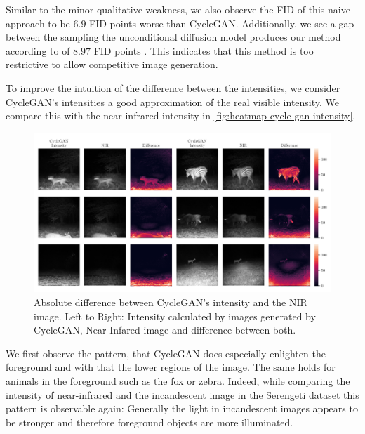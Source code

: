 Similar to the minor qualitative weakness, we also observe the FID of this naive approach to be $6.9$ FID points worse than CycleGAN.
Additionally, we see a gap between the sampling the unconditional diffusion model produces our method according to  of $8.97$ FID points \parencite{sbgm}.
This indicates that this method is too restrictive to allow competitive image generation.



To improve the intuition of the difference between the intensities, we consider CycleGAN's intensities a good approximation of the real visible intensity.
We compare this with the near-infrared intensity in \autoref{fig:heatmap-cycle-gan-intensity}.

\begin{figure}[htp!]
    \centering
    \includegraphics[width=\textwidth]{gfx/heatmap-nir-cycle-gan-intensity-diff.pdf}
    \caption{
        Absolute difference between CycleGAN's intensity and the NIR image.
        Left to Right: Intensity calculated by images generated by CycleGAN, Near-Infared image \parencite{serengeti} and difference between both.
    }
    \label{fig:heatmap-cycle-gan-intensity}
\end{figure}

We first observe the pattern, that CycleGAN does especially enlighten the foreground and with that the lower regions of the image.
The same holds for animals in the foreground such as the fox or zebra.
Indeed, while comparing the intensity of near-infrared and the incandescent image in the Serengeti dataset \parencite{serengeti}
this pattern is observable again:
Generally the light in incandescent images appears to be stronger and therefore foreground objects are more illuminated.

